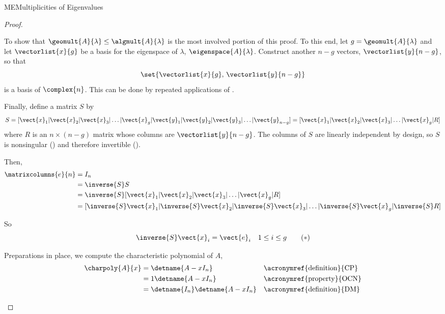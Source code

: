 \begin{subsect}{ME}{Multiplicities of Eigenvalues}
\begin{proof}
%
\begin{para}To show that $\geomult{A}{\lambda}\leq\algmult{A}{\lambda}$ is the most involved portion of this proof.  To this end, let $g=\geomult{A}{\lambda}$ and let $\vectorlist{x}{g}$ be a basis for the eigenspace of $\lambda$, $\eigenspace{A}{\lambda}$.  Construct another $n-g$ vectors, $\vectorlist{y}{n-g}$, so that
%
\begin{equation*}
\set{\vectorlist{x}{g},\,\vectorlist{y}{n-g}}
\end{equation*}
%
is a basis of $\complex{n}$.  This can be done by repeated applications of .\end{para}
%
\begin{para}Finally, define a matrix $S$ by
%
\begin{equation*}
S=[\vect{x}_1|\vect{x}_2|\vect{x}_3|\ldots|\vect{x}_g|\vect{y}_1|\vect{y}_2|\vect{y}_3|\ldots|\vect{y}_{n-g}]
=[\vect{x}_1|\vect{x}_2|\vect{x}_3|\ldots|\vect{x}_g|R]
\end{equation*}
%
where $R$ is an $n\times(n-g)$ matrix whose columns are $\vectorlist{y}{n-g}$.  The columns of $S$ are linearly independent by design, so $S$ is nonsingular () and therefore invertible ().\end{para}
%
\begin{para}Then,
%
\begin{align*}
\matrixcolumns{e}{n}&=I_n\\
&=\inverse{S}S\\
&=\inverse{S}[\vect{x}_1|\vect{x}_2|\vect{x}_3|\ldots|\vect{x}_g|R]\\
&=[\inverse{S}\vect{x}_1|\inverse{S}\vect{x}_2|\inverse{S}\vect{x}_3|\ldots|\inverse{S}\vect{x}_g|\inverse{S}R]
\end{align*}
\end{para}
%
\begin{para}So
%
\begin{equation*}
\inverse{S}\vect{x}_i=\vect{e}_i\quad 1\leq i\leq g\tag{$*$}
\end{equation*}
\end{para}
%
\begin{para}Preparations in place, we compute the characteristic polynomial of $A$,
%
\begin{align*}
\charpoly{A}{x}&=\detname{A-xI_n}&&\text{\acronymref{definition}{CP}}\\
&=1\detname{A-xI_n}&&\text{\acronymref{property}{OCN}}\\
&=\detname{I_n}\detname{A-xI_n}&&\text{\acronymref{definition}{DM}}\\

\end{align*}
\end{para}
\end{proof}
\end{subsect}
